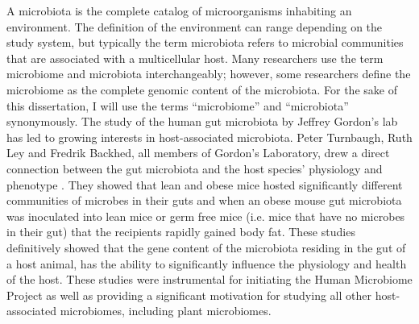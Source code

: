 A microbiota is the complete catalog of microorganisms inhabiting an environment. The definition of the environment can range depending on the study system, but typically the term microbiota refers to microbial communities that are associated with a multicellular host. Many researchers use the term microbiome and microbiota interchangeably; however, some researchers define the microbiome as the complete genomic content of the microbiota. For the sake of this dissertation, I will use the terms ``microbiome'' and ``microbiota'' synonymously. The study of the human gut microbiota by Jeffrey Gordon's lab has led to growing interests in host-associated microbiota. Peter Turnbaugh, Ruth Ley and Fredrik Backhed, all members of Gordon's Laboratory, drew a direct connection between the gut microbiota and the host species' physiology and phenotype \cite{Turnbaugh,Backhed,Ley2005}. They showed that lean and obese mice hosted significantly different communities of microbes in their guts and when an obese mouse gut microbiota was inoculated into lean mice or germ free mice (i.e. mice that have no microbes in their gut) that the recipients rapidly gained body fat. These studies definitively showed that the gene content of the microbiota residing in the gut of a host animal, has the ability to significantly influence the physiology and health of the host. These studies were instrumental for initiating the Human Microbiome Project \cite{Turnbaugh2007} as well as providing a significant motivation for studying all other host-associated microbiomes, including plant microbiomes.

